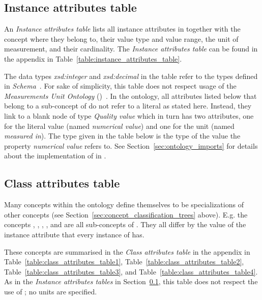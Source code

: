\subsection{Instance attributes table}
\label{subsec:instance_attributes_table}

An \emph{Instance attributes table} lists all instance attributes in \smarthomeweather together with the concept where they belong to, their value type and value range, the unit of measurement, and their cardinality. The \emph{Instance attributes table} can be found in the appendix in Table~\ref{table:instance_attributes_table}.

The data types \emph{xsd:integer} and \emph{xsd:decimal} in the table refer to the types defined in \emph{ Schema}~\cite{xml-schema-datatypes}. For sake of simplicity, this table does not respect usage of the \emph{Measurements Unit Ontology} (\muo)~\cite{MUO}. In the ontology, all attributes listed below that belong to a sub-concept of  do not refer to a literal as stated here. Instead, they link to a blank node of type \emph{Quality value} which in turn has two attributes, one for the literal value (named \emph{numerical value}) and one for the unit (named \emph{measured in}). The type given in the table below is the type of the value the property \emph{numerical value} refers to. See Section~\ref{sec:ontology_imports} for details about the implementation of \muo in \smarthomeweather.

\subsection{Class attributes table}
\label{subsec:class_attributes_table}

Many concepts within the \smarthomeweather ontology define themselves to be specializations of other concepts (see Section~\ref{sec:concept_classification_trees} above). E.g. the concepts , , , , and  are all sub-concepts of . They all differ by the value of the instance attribute  that every instance of  has.

These concepts are summarised in the \emph{Class attributes table} in the appendix in Table~\ref{table:class_attributes_table1}, Table~\ref{table:class_attributes_table2}, Table~\ref{table:class_attributes_table3}, and Table~\ref{table:class_attributes_table4}. As in the \emph{Instance attributes tables} in Section~\ref{subsec:instance_attributes_table}, this table does not respect the use of \muo; no units are specified.

